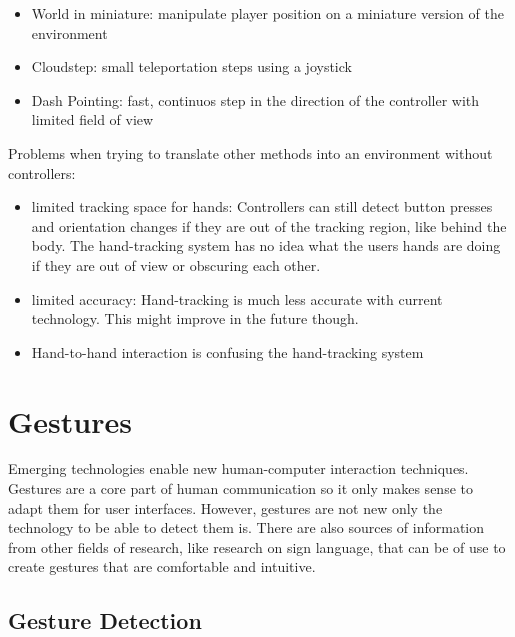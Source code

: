 \begin{itemize}
\itemsep1pt\parskip0pt
\item
  World in miniature: manipulate player position on a miniature version of the environment
\item
  Cloudstep: small teleportation steps using a joystick
\item
  Dash Pointing: fast, continuos step in the direction of the controller with limited field of view
\end{itemize}


Problems when trying to translate other methods into an environment without controllers:

\begin{itemize}
\item
  limited tracking space for hands: Controllers can still detect button
  presses and orientation changes if they are out of the tracking
  region, like behind the body. The hand-tracking system has no idea
  what the users hands are doing if they are out of view or obscuring
  each other.\\
\item
  limited accuracy: Hand-tracking is much less accurate with current
  technology. This might improve in the future though.\\
\item
  Hand-to-hand interaction is confusing the hand-tracking system\\
\end{itemize}

\section{Gestures}\label{gestures}

Emerging technologies enable new human-computer interaction techniques. Gestures are a core part of human communication so it only makes sense to adapt them for user interfaces. However, gestures are not new only the technology to be able to detect them is. There are also sources of information from other fields of research, like research on sign language, that can be of use to create gestures that are comfortable and intuitive.


\subsection{Gesture Detection}\label{gesture-detection}

